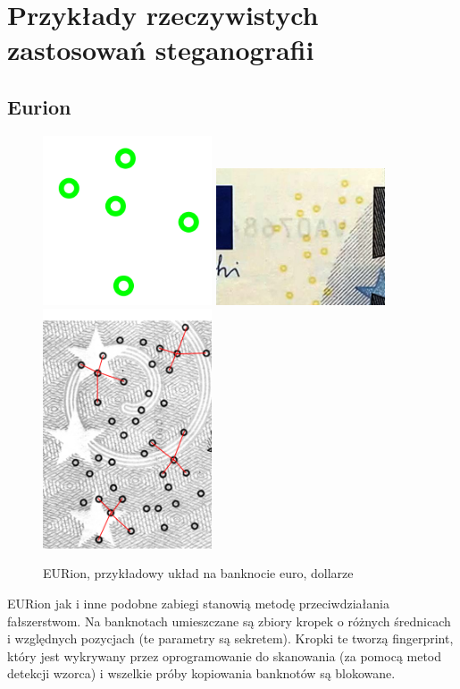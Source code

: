 \documentclass{article}
\begin{document}
\section{Przykłady rzeczywistych zastosowań steganografii}
\subsection{Eurion}
\begin{figure}[H]
	\centering
	\includegraphics[width=5cm]{eurion}
	\includegraphics[width=5cm]{euro}
	\includegraphics[width=5cm]{close}
	\caption{EURion, przykładowy układ na banknocie euro, dollarze}
\end{figure}
EURion jak i inne podobne zabiegi stanowią metodę przeciwdziałania fałszerstwom. Na banknotach umieszczane
są zbiory kropek o różnych średnicach i względnych pozycjach (te parametry są sekretem). Kropki te tworzą
fingerprint, który jest wykrywany przez oprogramowanie do skanowania (za pomocą metod detekcji wzorca) i
wszelkie próby kopiowania banknotów są blokowane.  
\end{document}
